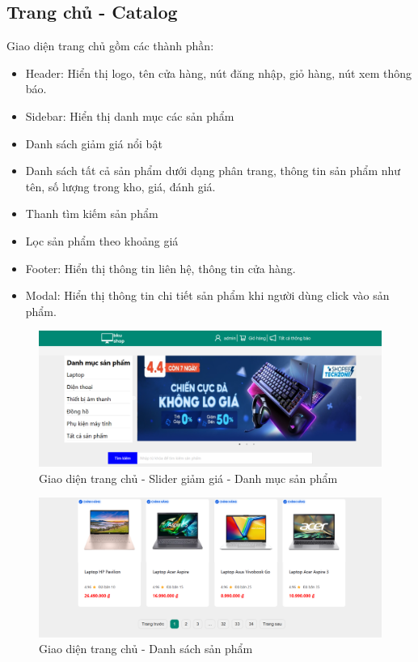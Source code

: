 \subsection{Trang chủ - Catalog}
\noindent Giao diện trang chủ gồm các thành phần:
\begin{itemize}
    \item Header: Hiển thị logo, tên cửa hàng, nút đăng nhập, giỏ hàng, nút xem thông báo.
    \item Sidebar: Hiển thị danh mục các sản phẩm
    \item Danh sách giảm giá nổi bật
    \item Danh sách tất cả sản phẩm dưới dạng phân trang, thông tin sản phẩm như tên, số lượng trong kho, giá, đánh giá.
    \item Thanh tìm kiếm sản phẩm
    \item Lọc sản phẩm theo khoảng giá
    \item Footer: Hiển thị thông tin liên hệ, thông tin cửa hàng.
    \item Modal: Hiển thị thông tin chi tiết sản phẩm khi người dùng click vào sản phẩm.
\end{itemize}
\begin{figure}[H]
    \begin{center}
    \includegraphics[scale=0.35]{images/hieu/chap-5/catalog-1.png}
    \vspace*{3mm}
    \caption{Giao diện trang chủ - Slider giảm giá - Danh mục sản phẩm}
    \end{center}
\end{figure}

\begin{figure}[H]
    \begin{center}
    \includegraphics[scale=0.35]{images/hieu/chap-5/catalog-2.png}
    \vspace*{3mm}
    \caption{Giao diện trang chủ - Danh sách sản phẩm }
    \end{center}
\end{figure}


